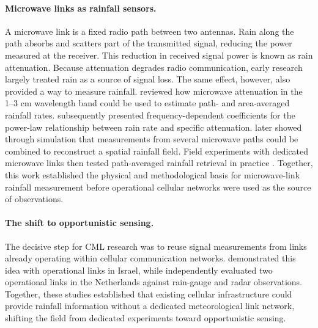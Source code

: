 \documentclass[11pt]{article}
\begin{document}
\paragraph*{Microwave links as rainfall sensors.} A microwave link is a fixed radio path between two antennas. Rain along the path absorbs and scatters part of the transmitted signal, reducing the power measured at the receiver. This reduction in received signal power is known as rain attenuation. Because attenuation degrades radio communication, early research largely treated rain as a source of signal loss. The same effect, however, also provided a way to measure rainfall. \citet{atlas1977path} reviewed how microwave attenuation in the 1--3 cm wavelength band could be used to estimate path- and area-averaged rainfall rates. \citet{olsen1978rain} subsequently presented frequency-dependent coefficients for the power-law relationship between rain rate and specific attenuation. \citet{giuli1991tomographic} later showed through simulation that measurements from several microwave paths could be combined to reconstruct a spatial rainfall field. Field experiments with dedicated microwave links then tested path-averaged rainfall retrieval in practice \citep{holt2000measurement,rahimi2003dual,upton2005microwave}. Together, this work established the physical and methodological basis for microwave-link rainfall measurement before operational cellular networks were used as the source of observations.

\paragraph*{The shift to opportunistic sensing.} The decisive step for CML research was to reuse signal measurements from links already operating within cellular communication networks. \citet{messer2006environmental} demonstrated this idea with operational links in Israel, while \citet{leijnse2007cellular} independently evaluated two operational links in the Netherlands against rain-gauge and radar observations. Together, these studies established that existing cellular infrastructure could provide rainfall information without a dedicated meteorological link network, shifting the field from dedicated experiments toward opportunistic sensing.
\end{document}
